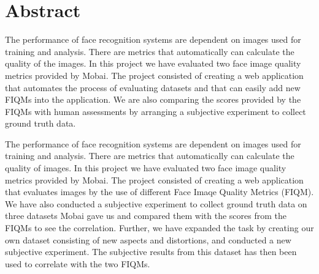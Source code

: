 \chapter*{Abstract}

The performance of face recognition systems are dependent on images used for training and analysis. There are metrics that automatically can calculate the quality of the images. In this project we have evaluated two face image quality metrics provided by Mobai. The project consisted of creating a web application that automates the process of evaluating datasets and that can easily add new FIQMs into the application. We are also comparing the scores provided by the FIQMs with human assessments by arranging a subjective experiment to collect ground truth data. 


The performance of face recognition systems are dependent on images used for training and analysis. There are metrics that automatically can calculate the quality of images. In this project we have evaluated two face image quality metrics provided by Mobai. The project consisted of creating a web application that evaluates images by the use of different Face Imaqe Quality Metrics (FIQM). We have also conducted a subjective experiment to collect ground truth data on three datasets Mobai gave us and compared them with the scores from the FIQMs to see the correlation. Further, we have expanded the task by creating our own dataset consisting of new aspects and distortions, and conducted a new subjective experiment. The subjective results from this dataset has then been used to correlate with the two FIQMs.
